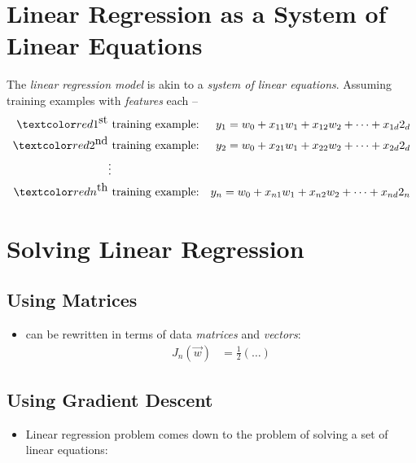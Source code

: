 \documentclass[
	title={Linear Regression}
]{cs584notes}
\begin{document}
\section{Linear Regression as a System of Linear Equations}\label{sec:linear-regression-as-a-system-of-linear-equations}
The \emph{linear regression model} is akin to a \emph{system of linear equations}.
Assuming  training examples with  \emph{features} each --
\begin{equation*}
\begin{aligned}
	\data{1^{\mbox{st}}} & \mbox{ training example:} & y_{1} = w_{0} + x_{11}w_{1} + x_{12}w_{2} + \dots + x_{1d}2_{d}\\
	\data{2^{\mbox{nd}}} & \mbox{ training example:} & y_{2} = w_{0} + x_{21}w_{1} + x_{22}w_{2} + \dots + x_{2d}2_{d}\\
	 & \vdots & \\
	\data{n^{\mbox{th}}} & \mbox{ training example:} & y_{n} = w_{0} + x_{n1}w_{1} + x_{n2}w_{2} + \dots + x_{nd}2_{n}\\
\end{aligned}
\end{equation*}

\section{Solving Linear Regression}\label{sec:solving-linear-regression}
\subsection{Using Matrices}\label{subsec:using-matrices}
\begin{itemize}
	\item {} can be rewritten in terms of data \emph{matrices}  and \emph{vectors}:
	\begin{equation*}
	\begin{aligned}
		J_{n}(\vec{w}) &= \frac{1}{2}(\dots)
	\end{aligned}
	\end{equation*}
\end{itemize}

\subsection{Using Gradient Descent}\label{subsec:using-gradient-descent}
\begin{itemize}
	\item Linear regression problem comes down to the problem of solving a set of linear equations:
\end{itemize}
\end{document}
